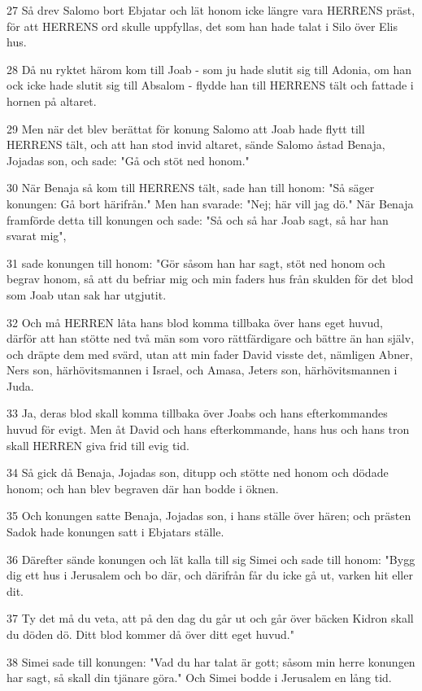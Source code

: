\par 27 Så drev Salomo bort Ebjatar och lät honom icke längre vara HERRENS präst, för att HERRENS ord skulle uppfyllas, det som han hade talat i Silo över Elis hus.
\par 28 Då nu ryktet härom kom till Joab - som ju hade slutit sig till Adonia, om han ock icke hade slutit sig till Absalom - flydde han till HERRENS tält och fattade i hornen på altaret.
\par 29 Men när det blev berättat för konung Salomo att Joab hade flytt till HERRENS tält, och att han stod invid altaret, sände Salomo åstad Benaja, Jojadas son, och sade: "Gå och stöt ned honom."
\par 30 När Benaja så kom till HERRENS tält, sade han till honom: "Så säger konungen: Gå bort härifrån." Men han svarade: "Nej; här vill jag dö." När Benaja framförde detta till konungen och sade: "Så och så har Joab sagt, så har han svarat mig",
\par 31 sade konungen till honom: "Gör såsom han har sagt, stöt ned honom och begrav honom, så att du befriar mig och min faders hus från skulden för det blod som Joab utan sak har utgjutit.
\par 32 Och må HERREN låta hans blod komma tillbaka över hans eget huvud, därför att han stötte ned två män som voro rättfärdigare och bättre än han själv, och dräpte dem med svärd, utan att min fader David visste det, nämligen Abner, Ners son, härhövitsmannen i Israel, och Amasa, Jeters son, härhövitsmannen i Juda.
\par 33 Ja, deras blod skall komma tillbaka över Joabs och hans efterkommandes huvud för evigt. Men åt David och hans efterkommande, hans hus och hans tron skall HERREN giva frid till evig tid.
\par 34 Så gick då Benaja, Jojadas son, ditupp och stötte ned honom och dödade honom; och han blev begraven där han bodde i öknen.
\par 35 Och konungen satte Benaja, Jojadas son, i hans ställe över hären; och prästen Sadok hade konungen satt i Ebjatars ställe.
\par 36 Därefter sände konungen och lät kalla till sig Simei och sade till honom: "Bygg dig ett hus i Jerusalem och bo där, och därifrån får du icke gå ut, varken hit eller dit.
\par 37 Ty det må du veta, att på den dag du går ut och går över bäcken Kidron skall du döden dö. Ditt blod kommer då över ditt eget huvud."
\par 38 Simei sade till konungen: "Vad du har talat är gott; såsom min herre konungen har sagt, så skall din tjänare göra." Och Simei bodde i Jerusalem en lång tid.

